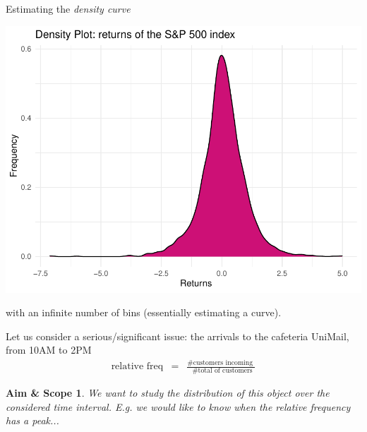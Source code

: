 \documentclass[notes=show,smaller]{beamer}\usepackage[]{graphicx}\usepackage[]{color}
\newenvironment{knitrout}{}{} %
\newtheorem{aes}{Aim \& Scope}[section]
\begin{document}
\begin{frame}
  \begin{example}[continued]
  Estimating the \emph{density curve}
\begin{knitrout}
\color{fgcolor}

{\centering \includegraphics[width=0.5\linewidth]{figure/unnamed-chunk-6-1} 

}



\end{knitrout}
  with an infinite number of bins (essentially estimating a curve).
  \end{example}
\end{frame}

\begin{frame}{\secname}

\begin{example}[Cafeteria]
  Let us consider a serious/significant issue: the arrivals to the cafeteria
  UniMail, from 10AM to 2PM
  \begin{eqnarray*}
  \mbox{relative freq}&=& \frac{\mbox{\# customers incoming }}{\mbox{ \# total of customers}}
  \end{eqnarray*}

  \begin{aes}
  We want to study the distribution of this object over the considered time interval. E.g. we would like to know when the relative frequency has a peak...
  \end{aes}

  \end{example}
\end{frame}
\end{document}
